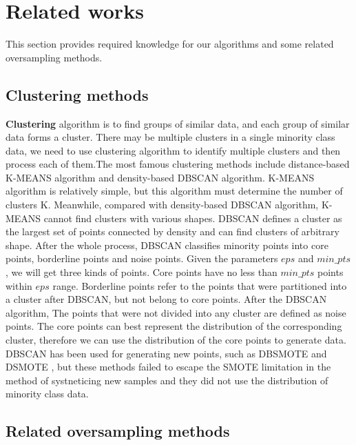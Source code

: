 \documentclass[ida]{iosart2x}
\begin{document}
\section{Related works}
This section provides required knowledge for our algorithms and some related oversampling methods.
\subsection{Clustering methods}

\textbf{Clustering} algorithm is to find groups of similar data, and each group of similar data forms a cluster.
There may be multiple clusters in a single minority class data, 
we need to use clustering algorithm to identify multiple clusters
 and then process each of them.The most famous clustering methods include distance-based K-MEANS algorithm and density-based DBSCAN algorithm.
K-MEANS algorithm is relatively simple, but this algorithm must determine the number of clusters K.
Meanwhile, compared with density-based DBSCAN algorithm, K-MEANS cannot find clusters with various shapes.
DBSCAN defines a cluster as the largest set of points
 connected by density and can find clusters of arbitrary shape. After the whole process,
  DBSCAN classifies minority points into core points,
  borderline points and noise points.
 Given the parameters $eps$ and $min\_pts$, we will get three kinds of points. 
 Core points have no less than
  $min\_pts$ points within $eps$ range. 
  Borderline points refer to the points that were partitioned into a cluster after DBSCAN,
  but not belong to core points. After the DBSCAN algorithm, The points that were not divided into any cluster are 
  defined as noise points.
The core points can best represent the distribution of the corresponding cluster, 
therefore we can use the distribution of the core points to generate data.
DBSCAN has been used for generating new points, such as DBSMOTE \cite{2012DBSMOTE} and
DSMOTE \cite{2019Over}, but these methods failed to escape the SMOTE limitation in 
the method of systneticing new samples and they did not use the distribution of minority class data.

\subsection{Related oversampling methods}
\end{document}
